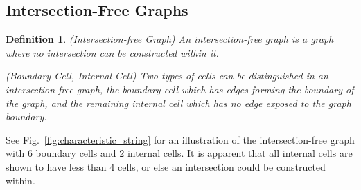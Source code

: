 \documentclass[journal]{IEEEtran}
\newtheorem{definition}[theorem]{Definition}
\begin{document}
\subsection{Intersection-Free Graphs}
\begin{definition}
(Intersection-free Graph) An intersection-free graph is a graph where no intersection can be constructed within it. 

(Boundary Cell, Internal Cell) Two types of cells can be distinguished in an intersection-free graph, the \textit{boundary cell} which has edges forming the boundary of the graph, and the remaining \textit{internal cell} which has no edge exposed to the graph boundary. 
\end{definition}
See Fig.~\ref{fig:characteristic_string} for an illustration of the intersection-free graph with $6$ boundary cells and $2$ internal cells. 
It is apparent that all internal cells are shown to have less than $4$ cells, or else an intersection could be constructed within. 
\end{document}
